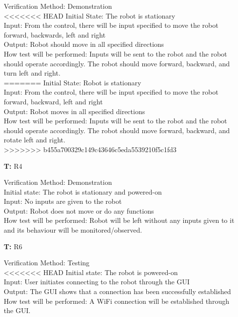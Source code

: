 \documentclass[12pt, titlepage]{article}
\newcounter{tnum} %
\begin{document}
\begin{itemize}
Verification Method: Demonstration\\
<<<<<<< HEAD
Initial State: The robot is stationary \\
Input: From the control, there will be input specified to move the robot forward, backwards, left and right \\
Output: Robot should move in all specified directions \\
How test will be performed: Inputs will be sent to the robot and the robot should operate accordingly. The robot should move forward, backward, and turn left and right. \\
=======
Initial State: Robot is stationary \\
Input: From the control, there will be input specified to move the robot forward, backward, left and right \\
Output: Robot moves in all specified directions \\
How test will be performed: Inputs will be sent to the robot and the robot should operate accordingly. The robot should move forward, backward, and rotate left and right. \\
>>>>>>> b455a700329c149c43646c5eda5539210f5c1fd3

\item[\textbf{T\refstepcounter{tnum}\thetnum:}]{R4\\}

Verification Method: Demonstration\\
Initial state: The robot is stationary and powered-on \\
Input: No inputs are given to the robot \\
Output: Robot does not move or do any functions \\
How test will be performed: Robot will be left without any inputs given to it and its behaviour will be monitored/observed. \\


\item[\textbf{T\refstepcounter{tnum}\thetnum:}]{R6\\}
 
Verification Method: Testing	\\
<<<<<<< HEAD
Initial state: The robot is powered-on \\
Input: User initiates connecting to the robot through the GUI\\
Output: The GUI shows that a connection has been successfully established  \\
How test will be performed: A WiFi connection will be established through the GUI. \\


\end{itemize}
\end{document}
